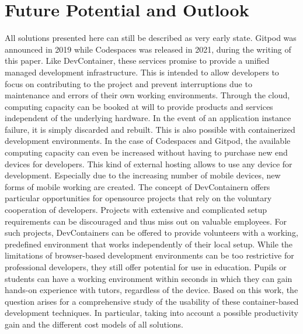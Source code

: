 
\section{Future Potential and Outlook}\label{sec::outlook}
All solutions presented here can still be described as very early state. Gitpod was announced in 2019 while Codespaces was released in 2021, during the writing of this paper. Like DevContainer, these services promise to provide a unified managed development infrastructure. This is intended to allow developers to focus on contributing to the project and prevent interruptions due to maintenance and errors of their own working environments. Through the cloud, computing capacity can be booked at will to provide products and services independent of the underlying hardware. In the event of an application instance failure, it is simply discarded and rebuilt. This is also possible with containerized development environments. In the case of Codespaces and Gitpod, the available computing capacity can even be increased without having to purchase new end devices for developers. This kind of external hosting allows to use any device for development. Especially due to the increasing number of mobile devices, new forms of mobile working are created.\newline
The concept of DevContainern offers particular opportunities for opensource projects that rely on the voluntary cooperation of developers. Projects with extensive and complicated setup requirements can be discouraged and thus miss out on valuable employees. For such projects, DevContainers can be offered to provide volunteers with a working, predefined environment that works independently of their local setup. While the limitations of browser-based development environments can be too restrictive for professional developers, they still offer potential for use in education. Pupils or students can have a working environment within seconds in which they can gain hands-on experience with tutors, regardless of the device.\newline
Based on this work, the question arises for a comprehensive study of the usability of these container-based development techniques. In particular, taking into account a possible productivity gain and the different cost models of all solutions.
